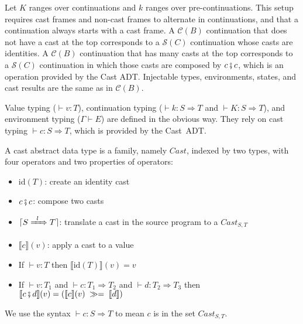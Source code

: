 \documentclass[runningheads]{llncs}
\newcommand{\CMachine}[1]{\ensuremath{\mathcal{C}(#1)}}
\newcommand{\CBMachine}[0]{\CMachine{B}}
\newcommand{\SMachine}[1]{\ensuremath{\mathcal{S}(#1)}}
\newcommand{\ccast}[3]{#1 \xRightarrow[]{\enskip #2 \enskip} #3}
\newcommand{\mbind}[0]{\ensuremath{\;\gg=\;}}
\newcommand{\denote}[1]{\ensuremath{\llbracket #1 \rrbracket}}
\newcommand{\compose}[2]{\ensuremath{#1 \fatsemi #2}}
\newcommand{\translate}[1]{\ensuremath{\lceil#1\rceil}}
\newcommand{\id}[1]{\ensuremath{\mathrm{id}(#1)}}
\newcommand{\valuetyping}[2]{\ensuremath{\vdash #1 : #2}}
\newcommand{\envtyping}[2]{\ensuremath{#1 \vdash #2}}
\newcommand{\casttyping}[3]{\ensuremath{\vdash #1 : #2 \Longrightarrow #3}}
\begin{document}
Let $K$ ranges over continuations and $k$ ranges over
pre-continuations.  This setup requires cast frames and non-cast
frames to alternate in continuations, and that a continuation always
starts with a cast frame.
A \CMachine{B} continuation that does not have a cast at the top
corresponds to a \SMachine{C} continuation whose casts are identities.
A \CMachine{B} continuation that has many casts at the top corresponds
to a \SMachine{C} continuation in which those casts are composed by
$\compose{c}{c}$, which is an operation provided by the Cast ADT.
%
Injectable types, environments, states, and cast results are the same
as in \CBMachine.

Value typing (\valuetyping{v}{T}), continuation typing
(\casttyping{k}{S}{T} and \casttyping{K}{S}{T}), and environment
typing (\envtyping{\Gamma}{E}) are defined in the obvious way.  They
rely on cast typing \casttyping{c}{S}{T}, which is provided by the
Cast~ADT.

\begin{definition}
	\label{def:cast-rep}
	A cast abstract data type is a family, namely $Cast$, indexed by two types, 
	with four operators and two properties of operators:
\begin{itemize}
	\item $\id{T}$: create an identity cast
	\item $\compose{c}{c}$: compose two casts
	\item $\translate{\ccast{S}{l}{T}}$: translate a cast in the source 
		program to a $\textit{Cast}_{S,T}$
	\item $\denote{c}(v)$: apply a cast to a value
	\item If $ \valuetyping{v}{T} $ then $\denote{\id{T}}(v)=v$
	\item If $ \valuetyping{v}{T_1} $ and
		$ \casttyping{c}{T_1}{T_2} $ and
		$ \casttyping{d}{T_2}{T_3} $ 
		then 
		$ \denote{\compose{c}{d}}(v) = (\denote{c}(v)\mbind\denote{d})$
\end{itemize}
We use the syntax \casttyping{c}{S}{T} to mean $c$ is in the set 
$\textit{Cast}_{S,T}$.
\end{definition}
\end{document}
